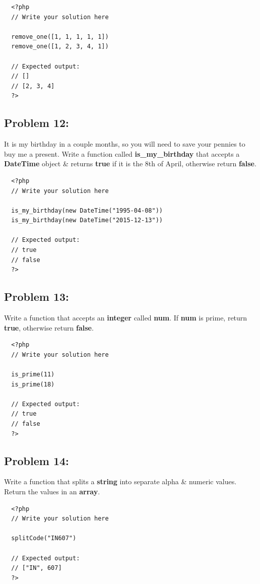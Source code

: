 \documentclass{article}
\begin{document}
\begin{verbatim}
  <?php  
  // Write your solution here

  remove_one([1, 1, 1, 1, 1])
  remove_one([1, 2, 3, 4, 1])

  // Expected output:
  // []
  // [2, 3, 4]
  ?>
\end{verbatim}

\subsection*{Problem 12:}
It is my birthday in a couple months, so you will need to save your pennies to buy me a present. Write a function called \textbf{is\_my\_birthday} that accepts a \textbf{DateTime} object \& returns \textbf{true} if it is the 8th of April, otherwise return \textbf{false}.

\begin{verbatim}
  <?php  
  // Write your solution here

  is_my_birthday(new DateTime("1995-04-08"))
  is_my_birthday(new DateTime("2015-12-13"))

  // Expected output:
  // true
  // false
  ?>
\end{verbatim}

\subsection*{Problem 13:}

Write a function that accepts an \textbf{integer} called \textbf{num}. If \textbf{num} is prime, return \textbf{true}, otherwise return \textbf{false}. 

\begin{verbatim}
  <?php  
  // Write your solution here

  is_prime(11)
  is_prime(18)

  // Expected output:
  // true
  // false
  ?>
\end{verbatim}

\subsection*{Problem 14:}
Write a function that splits a \textbf{string} into separate alpha \& numeric values. Return the values in an \textbf{array}.

\begin{verbatim}
  <?php  
  // Write your solution here

  splitCode("IN607")

  // Expected output:
  // ["IN", 607]
  ?>
\end{verbatim} 
\end{document}
